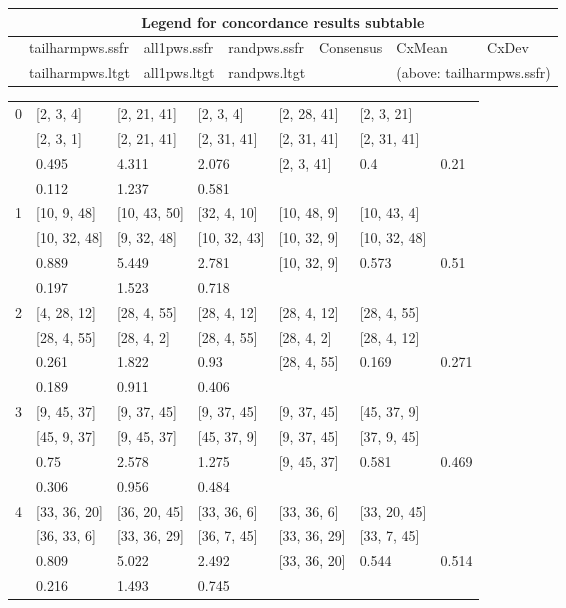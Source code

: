 
\begin{longtable}{| l || l | l | l | l | l | l | }
\hline
\multicolumn{7}{|c|}{\textbf{Legend for concordance results subtable}} \\
\hline
\hline
& tailharmpws.ssfr & all1pws.ssfr & randpws.ssfr  & Consensus & CxMean & CxDev\\
\hline
& tailharmpws.ltgt & all1pws.ltgt & randpws.ltgt &  & \multicolumn{2}{r|}{(above: tailharmpws.ssfr)}\\
\hline
\end{longtable}


\begin{longtable}{| l || l | l | l | l | l | l | }

\hline
0  & [2, 3, 4] & [2, 21, 41] & [2, 3, 4] & [2, 28, 41] & [2, 3, 21] \\
 & [2, 3, 1] & [2, 21, 41] & [2, 31, 41] & [2, 31, 41] & [2, 31, 41]\\
\hline
& 0.495 & 4.311 & 2.076 & [2, 3, 41] & 0.4 & 0.21\\
\hline
& 0.112 & 1.237 & 0.581 \\
\hline

\hline
1  & [10, 9, 48] & [10, 43, 50] & [32, 4, 10] & [10, 48, 9] & [10, 43, 4] \\
 & [10, 32, 48] & [9, 32, 48] & [10, 32, 43] & [10, 32, 9] & [10, 32, 48]\\
\hline
& 0.889 & 5.449 & 2.781 & [10, 32, 9] & 0.573 & 0.51\\
\hline
& 0.197 & 1.523 & 0.718 \\
\hline

\hline
2  & [4, 28, 12] & [28, 4, 55] & [28, 4, 12] & [28, 4, 12] & [28, 4, 55] \\
 & [28, 4, 55] & [28, 4, 2] & [28, 4, 55] & [28, 4, 2] & [28, 4, 12]\\
\hline
& 0.261 & 1.822 & 0.93 & [28, 4, 55] & 0.169 & 0.271\\
\hline
& 0.189 & 0.911 & 0.406 \\
\hline

\hline
3  & [9, 45, 37] & [9, 37, 45] & [9, 37, 45] & [9, 37, 45] & [45, 37, 9] \\
 & [45, 9, 37] & [9, 45, 37] & [45, 37, 9] & [9, 37, 45] & [37, 9, 45]\\
\hline
& 0.75 & 2.578 & 1.275 & [9, 45, 37] & 0.581 & 0.469\\
\hline
& 0.306 & 0.956 & 0.484 \\
\hline

\hline
4  & [33, 36, 20] & [36, 20, 45] & [33, 36, 6] & [33, 36, 6] & [33, 20, 45] \\
 & [36, 33, 6] & [33, 36, 29] & [36, 7, 45] & [33, 36, 29] & [33, 7, 45]\\
\hline
& 0.809 & 5.022 & 2.492 & [33, 36, 20] & 0.544 & 0.514\\
\hline
& 0.216 & 1.493 & 0.745 \\
\hline


\end{longtable}
